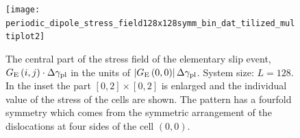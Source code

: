 \begin{figure}[htbp!] 
\centering    
\texttt{[image: periodic\_dipole\_stress\_field128x128symm\_bin\_dat\_tilized\_multiplot2]}
\caption[Stress field of the elementary slip event]{The central part of the stress field of the elementary slip event, ${G_{\rm{E}}}\left( {i,j} \right) \cdot \Delta {\gamma _{{\text{pl}}}}$ in the units of $\left| {{G_{\rm{E}}}\left( {0,0} \right)} \right|\Delta {\gamma _{{\rm{pl}}}}$. System size: $L=128$. In the inset the part $\left[ { 0,2} \right] \times \left[ { 0,2} \right]$  is enlarged and the individual value of the stress of the cells are shown. The pattern has a fourfold symmetry which comes from the symmetric arrangement of the dislocations at four sides of the cell $\left( {0,0} \right)$.}
\label{fig:weakest_greens_function}
\end{figure}

